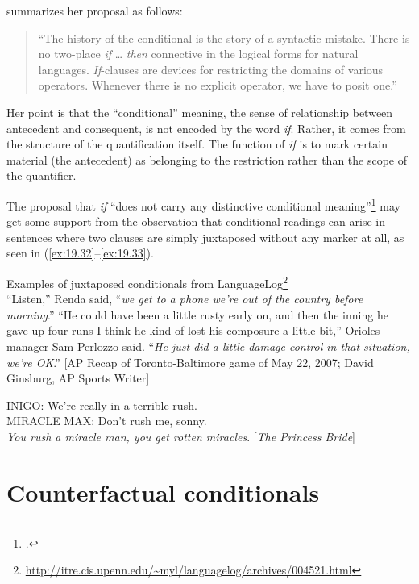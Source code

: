 \citet[11]{Kratzer1986} summarizes her proposal as follows:


\begin{quote}
“The history of the conditional is the story of a syntactic mistake. There is no two-place \textit{if} … \textit{then} connective in the logical forms for natural languages. \textit{If}-clauses are devices for restricting the domains of various operators. Whenever there is no explicit operator, we have to posit one.”
\end{quote}


Her point is that the “conditional” meaning, the sense of relationship between antecedent and consequent, is not encoded by the word \textit{if}. Rather, it comes from the structure of the quantification itself. The function of \textit{if} is to mark certain material (the antecedent) as belonging to the restriction rather than the scope of the quantifier.



The proposal that \textit{if} “does not carry any distinctive conditional meaning”\footnote{.} may get some support from the observation that conditional readings can arise in sentences where two clauses are simply juxtaposed without any marker at all, as seen in (\ref{ex:19.32}--\ref{ex:19.33}).


\ea \label{ex:19.32}
Examples of juxtaposed conditionals from LanguageLog\footnote{\url{http://itre.cis.upenn.edu/~myl/languagelog/archives/004521.html}} \\
\ea  “Listen,” Renda said, “\textit{we get to a phone we’re out of the country before morning}.”
\ex “He could have been a little rusty early on, and then the inning he gave up four runs I think he kind of lost his composure a little bit,” Orioles manager Sam Perlozzo said. “\textit{He just did a little damage control in that situation, we’re OK}.” [AP Recap of Toronto-Baltimore game of May 22, 2007; David Ginsburg, AP Sports Writer]
\z \z

\ea \label{ex:19.33}
INIGO: We’re really in a terrible rush.\\
MIRACLE MAX: Don’t rush me, sonny.\\
  \textit{You rush a miracle man, you get rotten miracles}.  [\textit{The Princess Bride}]
\z

\section{Counterfactual conditionals}\label{sec:19.6}


